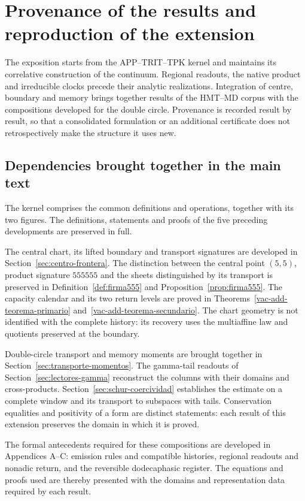 \section{Provenance of the results and reproduction of the extension}
\label{ap:procedencia-reproduccion}
\begingroup
\setlength{\parskip}{1pt}

The exposition starts from the APP--TRIT--TPK kernel and maintains its
correlative construction of the continuum. Regional readouts, the native product and
irreducible clocks precede their analytic realizations. Integration
of centre, boundary and memory brings together results of the HMT--MD corpus with
the compositions developed for the double circle. Provenance is
recorded result by result, so that a consolidated formulation or an additional
certificate does not retrospectively make the structure it uses new.

\subsection{Dependencies brought together in the main text}

The kernel comprises the common definitions and operations, together
with its two figures. The definitions, statements and proofs of the
five preceding developments are preserved in full.

The central chart, its lifted boundary and transport signatures are
developed in Section~\ref{sec:centro-frontera}. The distinction between
the central point \((5,5)\), product signature \(555555\) and the sheets
distinguished by its transport is preserved in Definition~\ref{def:firma555}
and Proposition~\ref{prop:firma555}. The capacity calendar and its
two return levels are proved in
Theorems~\ref{vac-add-teorema-primario} and~\ref{vac-add-teorema-secundario}.
The chart geometry is not identified with the complete history: its
recovery uses the multiaffine law and quotients preserved at the boundary.

Double-circle transport and memory moments are brought together in
Section~\ref{sec:transporte-momentos}. The gamma-tail readouts of
Section~\ref{sec:lectores-gamma} reconstruct the columns with their
domains and cross-products. Section~\ref{sec:schur-coercividad}
establishes the estimate on a complete window and its transport to
subspaces with tails. Conservation equalities and positivity
of a form are distinct statements: each result of this extension
preserves the domain in which it is proved.

The formal antecedents required for these compositions are developed
in Appendices A--C: emission rules and compatible histories, regional
readouts and nonadic return, and the reversible dodecaphasic register.
The equations and proofs used are thereby presented with the domains
and representation data required by each result.

